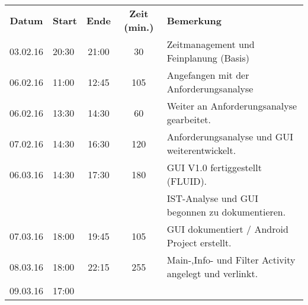\begin{tabular}{|c|l|c|c|l|}
	\rowcolor{black} {\color{white}\textbf{Datum}} & {\color{white}\textbf{Start}} & {\color{white}\textbf{Ende}} & {\color{white}\textbf{Zeit (min.)}} & {\color{white}\textbf{Bemerkung}} \\
	03.02.16 & 20:30 & 21:00 & 30 & Zeitmanagement und Feinplanung (Basis) \\ \hline
	\rowcolor{DarkSeaGreen} 06.02.16 & 11:00 & 12:45 & 105 & Angefangen mit der Anforderungsanalyse \\ \hline
	06.02.16 & 13:30 & 14:30 & 60 & Weiter an Anforderungsanalyse gearbeitet. \\ \hline
	\rowcolor{DarkSeaGreen} 07.02.16 & 14:30 & 16:30 & 120 & Anforderungsanalyse und GUI weiterentwickelt. \\ \hline
	06.03.16 & 14:30 & 17:30 & 180 & GUI V1.0 fertiggestellt (FLUID). \\ \hline
	\rowcolor{DarkSeaGreen} & & & & IST-Analyse und GUI begonnen zu dokumentieren. \\ \hline
	07.03.16 & 18:00 & 19:45 & 105 & GUI dokumentiert / Android Project erstellt. \\ \hline
	\rowcolor{DarkSeaGreen} 08.03.16 & 18:00 & 22:15 & 255 & Main-,Info- und Filter Activity angelegt und verlinkt. \\ \hline
	09.03.16 & 17:00 & & & \\ \hline
\end{tabular}